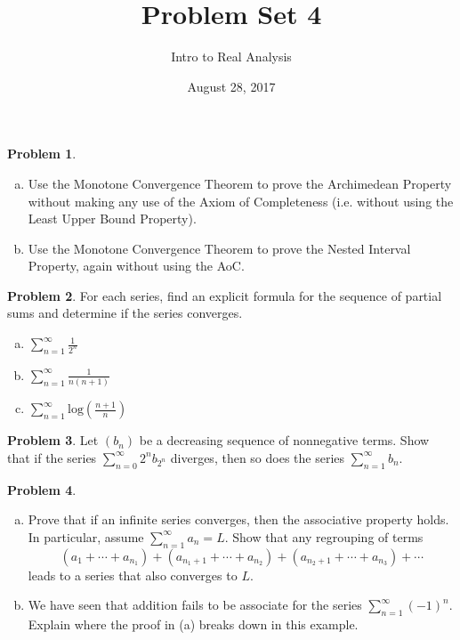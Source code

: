\documentclass{amsart}
\newcommand{\+}[1]{\ensuremath{\mathbf{#1}}}
\theoremstyle{definition}
\newtheorem{prob}{Problem}
\begin{document}
\title{Problem Set 4}
\date{August 28, 2017}
\author{Intro to Real Analysis}

\maketitle




\begin{prob}
\begin{enumerate}[(a)]
\item Use the Monotone Convergence Theorem
to prove the Archimedean Property
without making any use of the Axiom of Completeness (i.e. without using the Least Upper Bound Property).
\item Use the Monotone Convergence Theorem to prove the Nested Interval Property, again without
using the AoC.
\end{enumerate}
\end{prob}

\begin{prob}
 For each series, find an explicit formula for the sequence of partial sums and determine
 if the series converges.
 \begin{enumerate}[(a)]
  \item $\sum^{\infty}_{n=1}\frac{1}{2^n}$
  \vspace{2mm}
  \item $\sum^{\infty}_{n=1}\frac{1}{n(n+1)}$
  \vspace{2mm}
  \item $\sum^{\infty}_{n=1}\text{log}\left( \frac{n+1}{n} \right)$
 \end{enumerate}
\end{prob}


\begin{prob}
 Let $(b_n)$ be a decreasing sequence of nonnegative terms.  Show that if the series $\sum^{\infty}_{n=0}2^n b_{2^n}$ diverges, then so does
 the series $\sum^{\infty}_{n=1} b_n$.
\end{prob}

\begin{prob}
 \begin{enumerate}[(a)]
  \item Prove that if an infinite series converges, then the associative property holds.
  In particular, assume $\sum^{\infty}_{n=1} a_n = L$.  Show that any regrouping of terms
  \[
  (a_1 + \cdots + a_{n_1}) + (a_{n_1+1} + \cdots + a_{n_2}) + (a_{n_2 +1} + \cdots + a_{n_3}) + \cdots
  \]
  leads to a series that also converges to $L$.
  \item We have seen that addition fails to be associate for the series $\sum^{\infty}_{n=1} (-1)^n$.  Explain
  where the proof in (a) breaks down in this example.
 \end{enumerate}
\end{prob}
\end{document}
